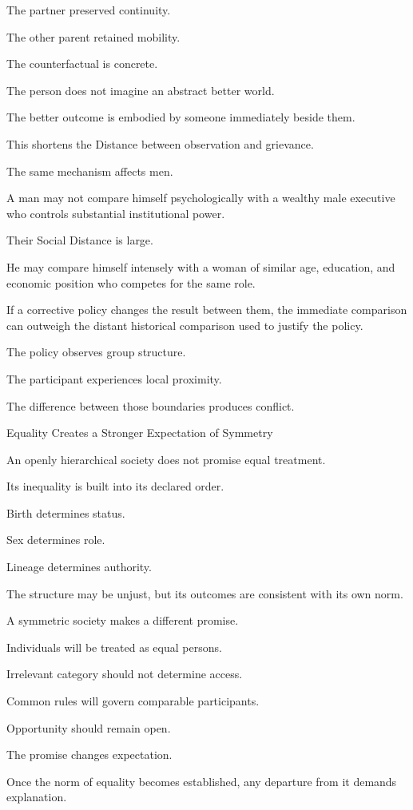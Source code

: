The partner preserved continuity.

The other parent retained mobility.

The counterfactual is concrete.

The person does not imagine an abstract better world.

The better outcome is embodied by someone immediately beside them.

This shortens the Distance between observation and grievance.

The same mechanism affects men.

A man may not compare himself psychologically with a wealthy male executive who controls substantial institutional power.

Their Social Distance is large.

He may compare himself intensely with a woman of similar age, education, and economic position who competes for the same role.

If a corrective policy changes the result between them, the immediate comparison can outweigh the distant historical comparison used to justify the policy.

The policy observes group structure.

The participant experiences local proximity.

The difference between those boundaries produces conflict.

Equality Creates a Stronger Expectation of Symmetry

An openly hierarchical society does not promise equal treatment.

Its inequality is built into its declared order.

Birth determines status.

Sex determines role.

Lineage determines authority.

The structure may be unjust, but its outcomes are consistent with its own norm.

A symmetric society makes a different promise.

Individuals will be treated as equal persons.

Irrelevant category should not determine access.

Common rules will govern comparable participants.

Opportunity should remain open.

The promise changes expectation.

Once the norm of equality becomes established, any departure from it demands explanation.

